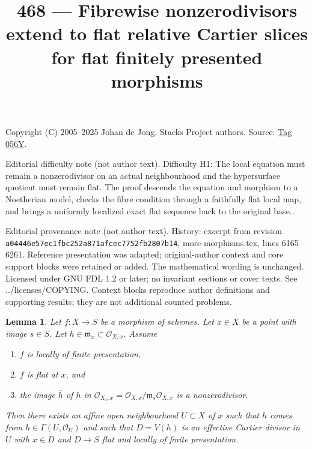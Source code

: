\documentclass{amsart}
\theoremstyle{plain}
\newtheorem{lemma}[subsection]{Lemma}
\theoremstyle{definition}
\theoremstyle{remark}
\numberwithin{equation}{subsection}
\begin{document}
\title[Stacks Project, Tag 056Y]{468 --- Fibrewise nonzerodivisors extend to flat relative Cartier slices for flat finitely presented morphisms}
\maketitle
\noindent Copyright (C) 2005--2025 Johan de Jong. Stacks Project authors. Source: \href{https://stacks.math.columbia.edu/tag/056Y}{Tag 056Y}.

\noindent Editorial difficulty note (not author text). Difficulty H1: The local equation must remain a nonzerodivisor on an actual neighbourhood and the hypersurface quotient must remain flat. The proof descends the equation and morphism to a Noetherian model, checks the fibre condition through a faithfully flat local map, and brings a uniformly localized exact flat sequence back to the original base..

\noindent Editorial provenance note (not author text). History: excerpt from revision \texttt{a0444\allowbreak 6e57e\allowbreak c1fbc\allowbreak 252a8\allowbreak 71afc\allowbreak ec775\allowbreak 2fb28\allowbreak 07b14}, more-morphisms.tex, lines 6165--6261. Reference presentation was adapted; original-author context and core support blocks were retained or added. The mathematical wording is unchanged. Licensed under GNU FDL 1.2 or later; no invariant sections or cover texts. See ../licenses/COPYING. Context blocks reproduce author definitions and supporting results; they are not additional counted problems.

\begin{lemma}
\label{lemma-slice-given-element}
Let $f : X \to S$ be a morphism of schemes.
Let $x \in X$ be a point with image $s \in S$.
Let $h \in \mathfrak m_x \subset \mathcal{O}_{X, x}$.
Assume
\begin{enumerate}
\item $f$ is locally of finite presentation,
\item $f$ is flat at $x$, and
\item the image $\overline{h}$ of $h$ in
$\mathcal{O}_{X_s, x} = \mathcal{O}_{X, x}/\mathfrak m_s\mathcal{O}_{X, x}$
is a nonzerodivisor.
\end{enumerate}
Then there exists an affine open neighbourhood $U \subset X$ of $x$
such that $h$ comes from $h \in \Gamma(U, \mathcal{O}_U)$ and such
that $D = V(h)$ is an effective Cartier divisor in $U$ with $x \in D$ and
$D \to S$ flat and locally of finite presentation.
\end{lemma}
\end{document}
